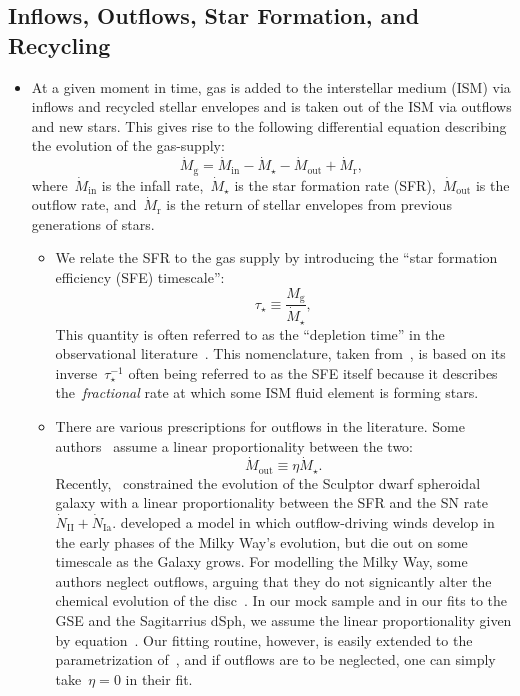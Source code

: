 \documentclass[ms.tex]{subfiles}
\begin{document}
\subsection{Inflows, Outflows, Star Formation, and Recycling}
\label{sec:onezone:gas}

\begin{itemize}

	\item At a given moment in time, gas is added to the interstellar medium
	(ISM) via inflows and recycled stellar envelopes and is taken out of the
	ISM via outflows and new stars.
	This gives rise to the following differential equation describing the
	evolution of the gas-supply:
	\begin{equation}
	\label{eq:mdot_gas}
	\dot{M}_\text{g} = \dot{M}_\text{in} - \dot{M}_\star - \dot{M}_\text{out}
	+ \dot{M}_\text{r},
	\end{equation}
	where~$\dot{M}_\text{in}$ is the infall rate,~$\dot{M}_\star$ is the star
	formation rate (SFR),~$\dot{M}_\text{out}$ is the outflow rate,
	and~$\dot{M}_\text{r}$ is the return of stellar envelopes from previous
	generations of stars.

	\begin{itemize}
		\item We relate the SFR to the gas supply by introducing the ``star
		formation efficiency (SFE) timescale'':
		\begin{equation}
		\tau_\star \equiv \frac{M_\text{g}}{\dot{M}_\star},
		\end{equation}
		This quantity is often referred to as the ``depletion time'' in the
		observational literature~\citep[e.g.][]{Tacconi2018}.
		This nomenclature, taken from~\citet{Weinberg2017}, is based on its
		inverse~$\tau_\star^{-1}$ often being referred to as the SFE itself
		because it describes the~\textit{fractional} rate at which some ISM
		fluid element is forming stars.

		\item There are various prescriptions for outflows in the literature.
		Some authors~\citep[e.g.][]{Andrews2017, Weinberg2017} assume a linear
		proportionality between the two:
		\begin{equation}
		\label{eq:eta}
		\dot{M}_\text{out} \equiv \eta\dot{M}_\star.
		\end{equation}
		Recently,~\citet{delosReyes2022} constrained the evolution of the
		Sculptor dwarf spheroidal galaxy with a linear proportionality between
		the SFR and the SN rate~$\dot{N}_\text{II} + \dot{N}_\text{Ia}$.
		\citet*{Kobayashi2020} developed a model in which outflow-driving winds
		develop in the early phases of the Milky Way's evolution, but die out
		on some timescale as the Galaxy grows.
		For modelling the Milky Way, some authors neglect outflows, arguing
		that they do not signicantly alter the chemical evolution of the
		disc~\citep[e.g.][]{Spitoni2019, Spitoni2021}.
		In our mock sample and in our fits to the GSE and the Sagitarrius dSph,
		we assume the linear proportionality given by equation~.
		Our fitting routine, however, is easily extended to the parametrization
		of~\citet{delosReyes2022}, and if outflows are to be neglected, one can
		simply take~$\eta = 0$ in their fit.


\end{itemize}
\end{itemize}
\end{document}

